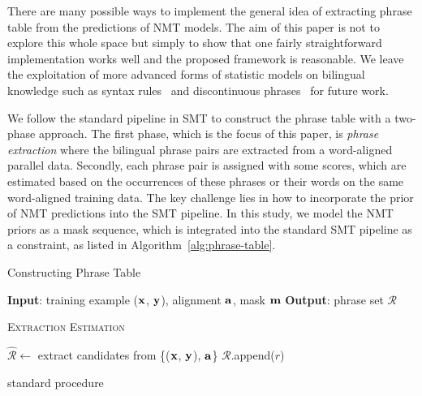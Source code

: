 \documentclass[11pt,a4paper]{article}
\begin{document}
There are many possible ways to implement the general idea of extracting phrase table from the predictions of NMT models. The aim of this paper is not to explore this whole space but simply to show that one fairly straightforward implementation works well and the proposed framework is reasonable. We leave the exploitation of more advanced forms of statistic models on bilingual knowledge such as syntax rules~\cite{Liu:2006:ACL} and discontinuous phrases~\cite{Galley:2010:NAACL} for future work.


We follow the standard pipeline in SMT to construct the phrase table with a two-phase approach.
The first phase, which is the focus of this paper, is {\em phrase extraction} where the bilingual phrase pairs are extracted from a word-aligned parallel data. Secondly, each phrase pair is assigned with some scores, which are estimated based on the occurrences of these phrases or their words on the same word-aligned training data.
The key challenge lies in how to incorporate the prior of NMT predictions into the SMT pipeline. In this study, we model the NMT priors as a mask sequence, which is integrated into the standard SMT pipeline as a constraint, as listed in Algorithm~\ref{alg:phrase-table}. 

\begin{algorithm}[t]
\small
\caption{Constructing Phrase Table}
\label{alg:phrase-table}
\begin{algorithmic}[1]
\Statex \textbf{Input}: training example ($\bf x$, $\bf y$), alignment $\bf a$, mask $\bf m$
\Statex \textbf{Output}: phrase set $\mathcal{R}$

\State \textsc{Extraction}
\State \textsc{Estimation}
\EndProcedure

\State $\widehat{\mathcal{R}} \leftarrow$ extract candidates from \{($\bf x$, $\bf y$), $\bf a$\}
   
        \State $\mathcal{R}$.append($r$)
    \EndIf
\EndFor
\EndProcedure

\State standard procedure
\EndProcedure
\end{algorithmic}
\end{algorithm}
\end{document}

